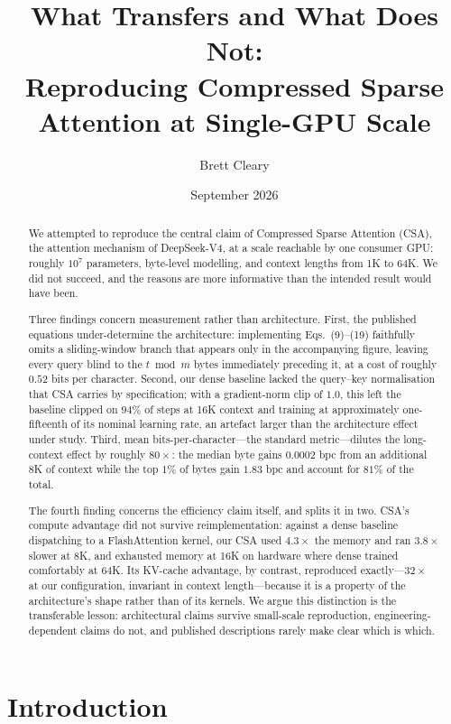 \documentclass[11pt]{article}
\title{\textbf{What Transfers and What Does Not:\\
Reproducing Compressed Sparse Attention at Single-GPU Scale}}
\author{Brett Cleary}
\date{September 2026}
\begin{document}
\maketitle

\begin{abstract}
We attempted to reproduce the central claim of Compressed Sparse Attention
(CSA), the attention mechanism of DeepSeek-V4, at a scale reachable by one
consumer GPU: roughly $10^7$ parameters, byte-level modelling, and context
lengths from 1K to 64K. We did not succeed, and the reasons are more
informative than the intended result would have been.

Three findings concern measurement rather than architecture. First, the
published equations under-determine the architecture: implementing
Eqs.~(9)--(19) faithfully omits a sliding-window branch that appears only in
the accompanying figure, leaving every query blind to the $t \bmod m$ bytes
immediately preceding it, at a cost of roughly $0.52$ bits per character.
Second, our dense baseline lacked the query--key normalisation that CSA carries
by specification; with a gradient-norm clip of $1.0$, this left the baseline
clipped on $94\%$ of steps at 16K context and training at approximately
one-fifteenth of its nominal learning rate, an artefact larger than the
architecture effect under study. Third, mean bits-per-character---the standard
metric---dilutes the long-context effect by roughly $80\times$: the median byte
gains $0.0002$ bpc from an additional 8K of context while the top $1\%$ of
bytes gain $1.83$ bpc and account for $81\%$ of the total.

The fourth finding concerns the efficiency claim itself, and splits it in two.
CSA's compute advantage did not survive reimplementation: against a dense
baseline dispatching to a FlashAttention kernel, our CSA used $4.3\times$ the
memory and ran $3.8\times$ slower at 8K, and exhausted memory at 16K on
hardware where dense trained comfortably at 64K. Its KV-cache advantage, by
contrast, reproduced exactly---$32\times$ at our configuration, invariant in
context length---because it is a property of the architecture's shape rather
than of its kernels. We argue this distinction is the transferable lesson:
architectural claims survive small-scale reproduction, engineering-dependent
claims do not, and published descriptions rarely make clear which is which.
\end{abstract}

\section{Introduction}
\end{document}
